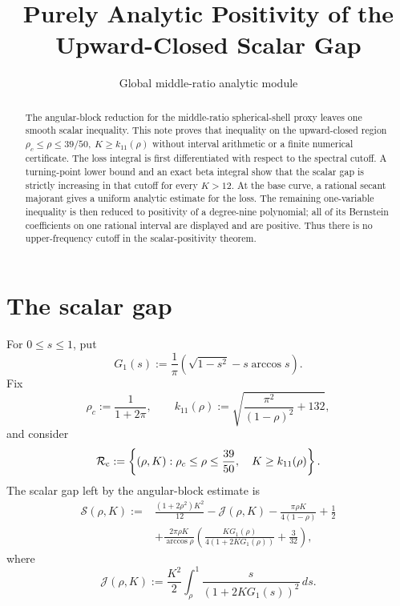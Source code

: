 \documentclass[11pt]{article}
\title{Purely Analytic Positivity of the Upward-Closed Scalar Gap}
\author{}
\date{Global middle-ratio analytic module}
\theoremstyle{remark}
\begin{document}
\maketitle

\begin{abstract}
The angular-block reduction for the middle-ratio spherical-shell proxy
leaves one smooth scalar inequality.  This note proves that inequality on
the upward-closed region
\(
 \rho_c\leq\rho\leq39/50,
 \ K\geq k_{11}(\rho)
\)
without interval arithmetic or a finite numerical certificate.  The loss
integral is first differentiated with respect to the spectral cutoff.  A
turning-point lower bound and an exact beta integral show that the scalar gap
is strictly increasing in that cutoff for every $K>12$.  At the base curve,
a rational secant majorant gives a uniform analytic estimate for the loss.
The remaining one-variable inequality is then reduced to positivity of a
degree-nine polynomial; all of its Bernstein coefficients on one rational
interval are displayed and are positive.  Thus there is no upper-frequency
cutoff in the scalar-positivity theorem.
\end{abstract}

\section{The scalar gap}

For \(0\leq s\leq1\), put
\begin{equation}
 G_1(s):=\frac1\pi\left(\sqrt{1-s^2}
                 -s\arccos s\right).
 \label{eq:G1}
\end{equation}
Fix
\begin{equation}
 \rho_c:=\frac1{1+2\pi},
 \qquad
 k_{11}(\rho):=
 \sqrt{\frac{\pi^2}{(1-\rho)^2}+132},
 \label{eq:constants}
\end{equation}
and consider
\begin{equation}
 \mathcal R_{\rm c}:=
 \left\{(\rho,K):
 \rho_c\leq\rho\leq\frac{39}{50},\quad
 K\geq k_{11}(\rho)\right\}.
 \label{eq:region}
\end{equation}
The scalar gap left by the angular-block estimate is
\begin{equation}
 \begin{aligned}
 \mathcal S(\rho,K):={}&
 \frac{(1+2\rho^2)K^2}{12}
 -\mathcal J(\rho,K)
 -\frac{\pi\rho K}{4(1-\rho)}+\frac12\\
 &+\frac{2\pi\rho K}{\arccos\rho}
 \left(
 \frac{KG_1(\rho)}{4(1+2KG_1(\rho))}
 +\frac3{32}
 \right),
 \end{aligned}
 \label{eq:S}
\end{equation}
where
\begin{equation}
 \mathcal J(\rho,K):=
 \frac{K^2}{2}\int_\rho^1
 \frac{s}{(1+2KG_1(s))^2}\,ds.
 \label{eq:J}
\end{equation}
\end{document}

